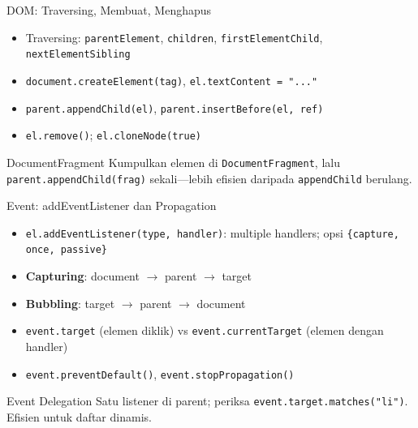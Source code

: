 \documentclass[handout]{beamer}
\begin{document}
\begin{frame}{DOM: Traversing, Membuat, Menghapus}
	\begin{itemize}
		\item Traversing: \texttt{parentElement}, \texttt{children}, \texttt{firstElementChild}, \texttt{nextElementSibling}
		\item \texttt{document.createElement(tag)}, \texttt{el.textContent = "..."}
		\item \texttt{parent.appendChild(el)}, \texttt{parent.insertBefore(el, ref)}
		\item \texttt{el.remove()}; \texttt{el.cloneNode(true)}
	\end{itemize}
	\begin{block}{DocumentFragment}
		Kumpulkan elemen di \texttt{DocumentFragment}, lalu \texttt{parent.appendChild(frag)} sekali---lebih efisien daripada \texttt{appendChild} berulang.
	\end{block}
\end{frame}

\begin{frame}{Event: addEventListener dan Propagation}
	\begin{itemize}
		\item \texttt{el.addEventListener(type, handler)}: multiple handlers; opsi \texttt{\{capture, once, passive\}}
		\item \textbf{Capturing}: document $\to$ parent $\to$ target
		\item \textbf{Bubbling}: target $\to$ parent $\to$ document
		\item \texttt{event.target} (elemen diklik) vs \texttt{event.currentTarget} (elemen dengan handler)
		\item \texttt{event.preventDefault()}, \texttt{event.stopPropagation()}
	\end{itemize}
	\begin{block}{Event Delegation}
		Satu listener di parent; periksa \texttt{event.target.matches("li")}. Efisien untuk daftar dinamis.
	\end{block}
\end{frame}
\end{document}
